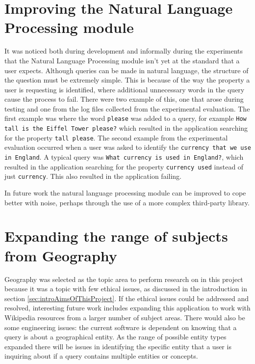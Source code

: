 \documentclass[authoryearcitations]{UoYCSproject}
\begin{document}
\section{Improving the Natural Language Processing module}
\label{sec:evalNlp}
It was noticed both during development and informally during the experiments that the Natural Language Processing module isn't yet at the standard that a user expects. Although queries can be made in natural language, the structure of the question must be extremely simple. This is because of the way the property a user is requesting is identified, where additional unnecessary words in the query cause the process to fail. There were two example of this, one that arose during testing and one from the log files collected from the experimental evaluation. The first example was where the word \texttt{please} was added to a query, for example \texttt{How tall is the Eiffel Tower please?} which resulted in the application searching for the property \texttt{tall please}. The second example from the experimental evaluation occurred when a user was asked to identify the \texttt{currency that we use in England}. A typical query was \texttt{What currency is used in England?}, which resulted in the application searching for the property \texttt{currency used} instead of just \texttt{currency}. This also resulted in the application failing.

In future work the natural language processing module can be improved to cope better with noise, perhaps through the use of a more complex third-party library.

\section{Expanding the range of subjects from Geography}
\label{sec:evalExpandingSubjects}
Geography was selected as the topic area to perform research on in this project because it was a topic with few ethical issues, as discussed in the introduction in section \ref{sec:introAimsOfThisProject}. If the ethical issues could be addressed and resolved, interesting future work includes expanding this application to work with Wikipedia resources from a larger number of subject areas. There would also be some engineering issues: the current software is dependent on knowing that a query is about a geographical entity. As the range of possible entity types expanded there will be issues in identifying the specific entity that a user is inquiring about if a query contains multiple entities or concepts.
\end{document}
